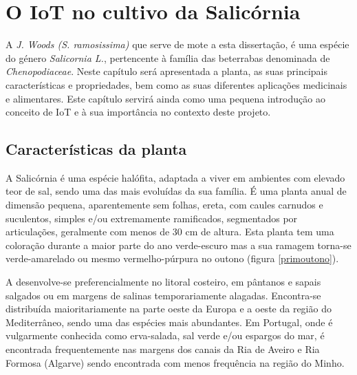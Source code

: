
\chapter{O \acl{IoT} no cultivo da Salicórnia}

 A \sr \space \textit{J. Woods (S. ramosissima)}\cite{JoaoSilva} que serve de mote a esta dissertação, é uma espécie do género \textit{Salicornia L.}, pertencente à família das beterrabas denominada de \textit{Chenopodiaceae}\cite{chenopodiaceae}.  Neste capítulo será apresentada a planta, as suas principais características e propriedades, bem como as suas diferentes aplicações medicinais e alimentares. Este capítulo servirá ainda como uma pequena introdução ao conceito de \ac{IoT} e à sua  importância no contexto deste projeto.


\section{Características da planta}


A Salicórnia é uma espécie halófita, adaptada a viver em ambientes com elevado teor de sal\cite{ferri}, sendo uma das mais evoluídas da sua família. É uma planta anual de dimensão pequena, aparentemente sem folhas, ereta, com caules carnudos e suculentos, simples e/ou extremamente ramificados, segmentados por articulações\cite{Silva2000}, geralmente com menos de 30 cm de altura\cite{overviewsal}. Esta planta tem uma coloração durante a maior parte do ano verde-escuro mas a sua ramagem torna-se  verde-amarelado ou mesmo vermelho-púrpura no outono\cite{Silva2000} (figura \ref{primoutono}).





A \sr \space desenvolve-se preferencialmente no litoral costeiro, em pântanos e sapais salgados ou em margens de salinas temporariamente alagadas. Encontra-se distribuída maioritariamente na parte oeste da Europa e a oeste da região do Mediterrâneo, sendo uma das espécies mais abundantes\cite{Figueroa1987}. Em Portugal, onde é vulgarmente conhecida como erva-salada, sal verde e/ou espargos do mar\cite{RaquelPinto}, é encontrada frequentemente nas margens dos canais da Ria de Aveiro e Ria Formosa (Algarve)\cite{RaquelPinto} sendo encontrada com menos frequência na região do Minho\cite{Silva2000}. 

\newpage

